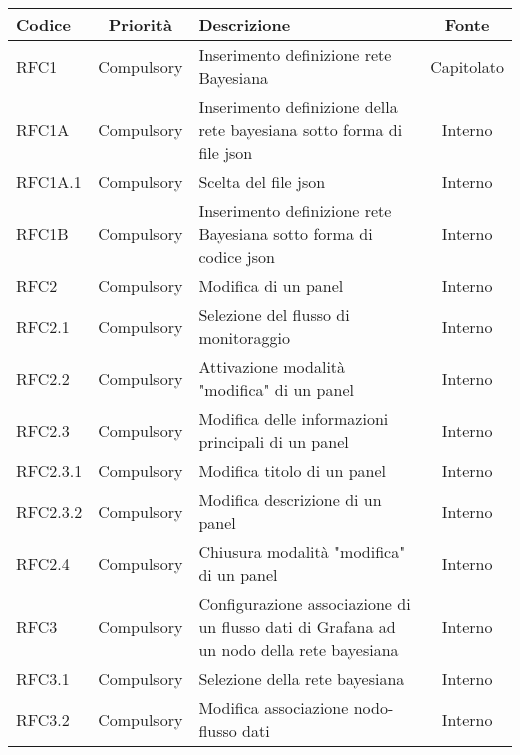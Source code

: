         \begin{table}[!htpb]
            \centering
            \renewcommand{\arraystretch}{1.5} %
            \begin{tabular}{|l|c|p{8cm}|c|}
                \rowcolor{orange!50}
        		\hline
        		\textbf{Codice} & \textbf{Priorità} & \textbf{Descrizione} & \textbf{Fonte}\\
                \hline
                RFC1 & Compulsory & Inserimento definizione rete Bayesiana & Capitolato\\
                \hline
                RFC1A & Compulsory & Inserimento definizione della rete bayesiana sotto forma di file json & Interno\\
                \hline
                RFC1A.1 & Compulsory & Scelta del file json & Interno\\
                \hline
                RFC1B & Compulsory & Inserimento definizione rete Bayesiana sotto forma di codice json & Interno\\
                \hline
                RFC2 & Compulsory & Modifica di un panel & Interno\\
                \hline
                RFC2.1 & Compulsory & Selezione del flusso di monitoraggio & Interno\\
                \hline
                RFC2.2 & Compulsory & Attivazione modalità "modifica" di un panel & Interno\\
                \hline
                RFC2.3 & Compulsory & Modifica delle informazioni principali di un panel & Interno\\
                \hline
                RFC2.3.1 & Compulsory & Modifica titolo di un panel & Interno\\
                \hline
                RFC2.3.2 & Compulsory & Modifica descrizione di un panel & Interno\\
                \hline
                RFC2.4 & Compulsory & Chiusura modalità "modifica" di un panel & Interno\\
                \hline
                RFC3 & Compulsory & Configurazione associazione di un flusso dati di Grafana ad un nodo della rete bayesiana & Interno\\
                \hline
                RFC3.1 & Compulsory & Selezione della rete bayesiana & Interno\\
                \hline
                RFC3.2 & Compulsory &  Modifica associazione nodo-flusso dati & Interno\\

\end{tabular}
\end{table}
